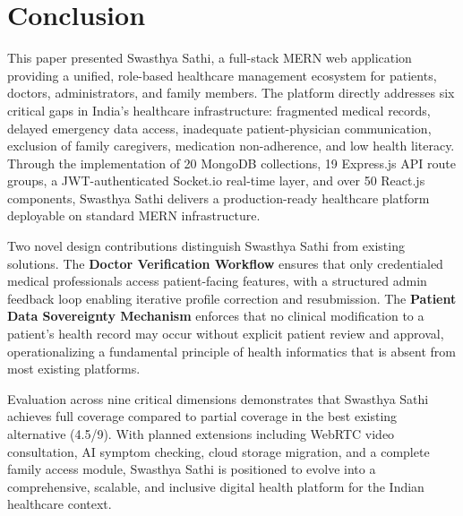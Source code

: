 \section{Conclusion}

This paper presented Swasthya Sathi, a full-stack MERN web application providing a unified, role-based healthcare management ecosystem for patients, doctors, administrators, and family members. The platform directly addresses six critical gaps in India's healthcare infrastructure: fragmented medical records, delayed emergency data access, inadequate patient-physician communication, exclusion of family caregivers, medication non-adherence, and low health literacy. Through the implementation of 20 MongoDB collections, 19 Express.js API route groups, a JWT-authenticated Socket.io real-time layer, and over 50 React.js components, Swasthya Sathi delivers a production-ready healthcare platform deployable on standard MERN infrastructure.

Two novel design contributions distinguish Swasthya Sathi from existing solutions. The \textbf{Doctor Verification Workflow} ensures that only credentialed medical professionals access patient-facing features, with a structured admin feedback loop enabling iterative profile correction and resubmission. The \textbf{Patient Data Sovereignty Mechanism} enforces that no clinical modification to a patient's health record may occur without explicit patient review and approval, operationalizing a fundamental principle of health informatics that is absent from most existing platforms.

Evaluation across nine critical dimensions demonstrates that Swasthya Sathi achieves full coverage compared to partial coverage in the best existing alternative (4.5/9). With planned extensions including WebRTC video consultation, AI symptom checking, cloud storage migration, and a complete family access module, Swasthya Sathi is positioned to evolve into a comprehensive, scalable, and inclusive digital health platform for the Indian healthcare context.

